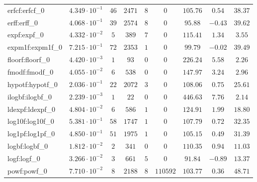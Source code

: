 \begin{tabular}{|l|c|c|c|c|c|c|c|c|}
erfcf:erfcf\_0               & $ 4.349 \cdot 10^{-1} $ & $ 46     $ & $ 2471  $ & $ 8   $ & $ 0      $ & $ 105.76      $ & $ 0.54    $ & $ 38.37   $ \\
erff:erff\_0                 & $ 4.068 \cdot 10^{-1} $ & $ 39     $ & $ 2574  $ & $ 8   $ & $ 0      $ & $ 95.88       $ & $ -0.43   $ & $ 39.62   $ \\
expf:expf\_0                 & $ 4.332 \cdot 10^{-2} $ & $ 5      $ & $ 389   $ & $ 7   $ & $ 0      $ & $ 115.41      $ & $ 1.34    $ & $ 3.55    $ \\
expm1f:expm1f\_0             & $ 7.215 \cdot 10^{-1} $ & $ 72     $ & $ 2353  $ & $ 1   $ & $ 0      $ & $ 99.79       $ & $ -0.02   $ & $ 39.49   $ \\
floorf:floorf\_0             & $ 4.420 \cdot 10^{-3} $ & $ 1      $ & $ 93    $ & $ 0   $ & $ 0      $ & $ 226.24      $ & $ 5.58    $ & $ 2.26    $ \\
fmodf:fmodf\_0               & $ 4.055 \cdot 10^{-2} $ & $ 6      $ & $ 538   $ & $ 0   $ & $ 0      $ & $ 147.97      $ & $ 3.24    $ & $ 2.96    $ \\
hypotf:hypotf\_0             & $ 2.036 \cdot 10^{-1} $ & $ 22     $ & $ 2072  $ & $ 3   $ & $ 0      $ & $ 108.06      $ & $ 0.75    $ & $ 25.61   $ \\
ilogbf:ilogbf\_0             & $ 2.239 \cdot 10^{-3} $ & $ 1      $ & $ 22    $ & $ 0   $ & $ 0      $ & $ 446.63      $ & $ 7.76    $ & $ 2.14    $ \\
ldexpf:ldexpf\_0             & $ 4.804 \cdot 10^{-2} $ & $ 6      $ & $ 586   $ & $ 1   $ & $ 0      $ & $ 124.91      $ & $ 1.99    $ & $ 18.80   $ \\
log10f:log10f\_0             & $ 5.381 \cdot 10^{-1} $ & $ 58     $ & $ 1747  $ & $ 1   $ & $ 0      $ & $ 107.79      $ & $ 0.72    $ & $ 32.35   $ \\
log1pf:log1pf\_0             & $ 4.850 \cdot 10^{-1} $ & $ 51     $ & $ 1975  $ & $ 1   $ & $ 0      $ & $ 105.15      $ & $ 0.49    $ & $ 31.39   $ \\
logbf:logbf\_0               & $ 1.812 \cdot 10^{-2} $ & $ 2      $ & $ 341   $ & $ 0   $ & $ 0      $ & $ 110.35      $ & $ 0.94    $ & $ 11.03   $ \\
logf:logf\_0                 & $ 3.266 \cdot 10^{-2} $ & $ 3      $ & $ 661   $ & $ 5   $ & $ 0      $ & $ 91.84       $ & $ -0.89   $ & $ 13.37   $ \\
powf:powf\_0                 & $ 7.710 \cdot 10^{-2} $ & $ 8      $ & $ 2188  $ & $ 8   $ & $ 110592 $ & $ 103.77      $ & $ 0.36    $ & $ 48.71   $ \\

\end{tabular}
